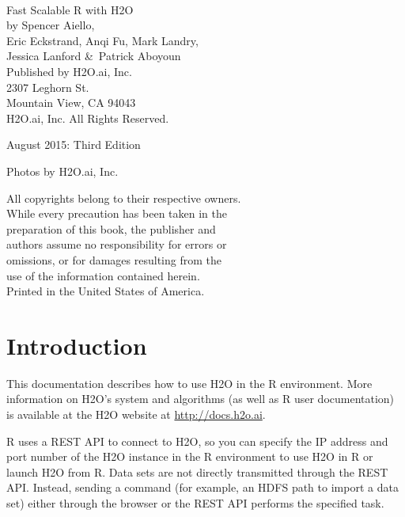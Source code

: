 {\raggedright\vfill\ 

Fast Scalable R with H2O\\

  by Spencer Aiello,\\ Eric Eckstrand, Anqi Fu, Mark Landry, \\ Jessica Lanford  \&\ Patrick Aboyoun\\
\bigskip
  Published by H2O.ai, Inc. \\
2307 Leghorn St. \\
Mountain View, CA 94043\\
\bigskip
{} H2O.ai, Inc. All Rights Reserved. 
\bigskip

August 2015: Third Edition
\bigskip

Photos by \textcopyright H2O.ai, Inc. 
\bigskip

All copyrights belong to their respective owners.\\
While every precaution has been taken in the\\
preparation of this book, the publisher and\\
authors assume no responsibility for errors or\\
omissions, or for damages resulting from the\\
use of the information contained herein.\\
\bigskip
Printed in the United States of America. 


}\par

\newpage
\thispagestyle{empty}%
\tableofcontents
\thispagestyle{empty}%
\newpage

\section{Introduction}

This documentation describes how to use H2O in the R environment. More information on H2O's system and algorithms (as well as R user documentation) is available at the H2O website at {\url{http://docs.h2o.ai}}. 

R uses a REST API to connect to H2O, so you can specify the IP address and port number of the H2O instance in the R environment to use H2O in R or launch H2O from R. Data sets are not directly transmitted through the REST API. Instead, sending a command (for example, an HDFS path to import a data set) either through the browser or the REST API performs the specified task.

